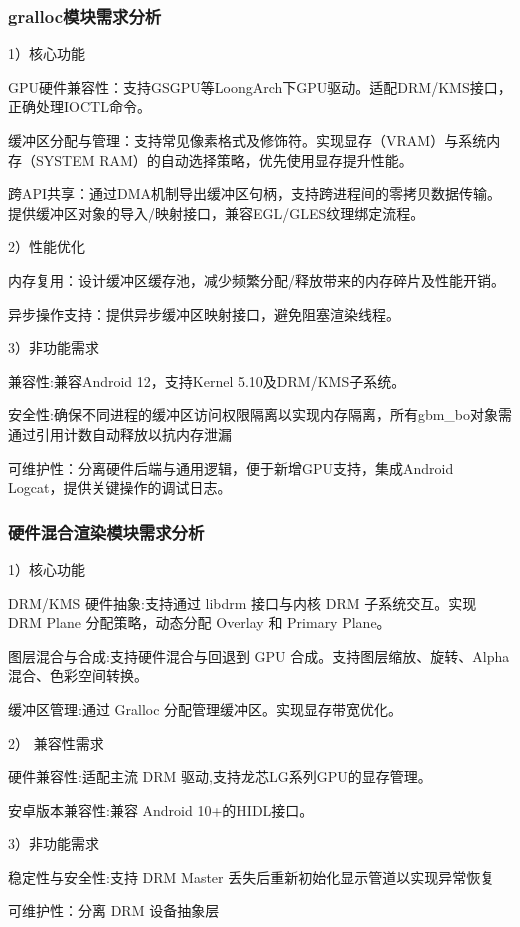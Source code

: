 \subsubsection{gralloc模块需求分析}
1）核心功能

    ​GPU硬件兼容性​：支持GSGPU等LoongArch下GPU驱动。适配DRM/KMS接口，正确处理IOCTL命令。

    ​缓冲区分配与管理​：支持常见像素格式及修饰符。实现显存（VRAM）与系统内存（SYSTEM RAM）的自动选择策略，优先使用显存提升性能。

    ​跨API共享​：通过DMA机制导出缓冲区句柄，支持跨进程间的零拷贝数据传输。提供缓冲区对象的导入/映射接口，兼容EGL/GLES纹理绑定流程。

2）性能优化

    ​内存复用​​：设计缓冲区缓存池，减少频繁分配/释放带来的内存碎片及性能开销。

    ​异步操作支持​：提供异步缓冲区映射接口，避免阻塞渲染线程。

3）非功能需求
        
    兼容性:兼容Android 12，支持Kernel 5.10及DRM/KMS子系统。
        
    安全性:​确保不同进程的缓冲区访问权限隔离以实现内存隔离，所有gbm\_bo对象需通过引用计数自动释放以抗内存泄漏
        
    可维护性：分离硬件后端与通用逻辑，便于新增GPU支持，集成Android Logcat，提供关键操作的调试日志。

\subsubsection{硬件混合渲染模块需求分析}

1）核心功能

DRM/KMS 硬件抽象​:支持通过 libdrm 接口与内核 DRM 子系统交互。实现 DRM Plane 分配策略，动态分配 Overlay 和 Primary Plane。

​图层混合与合成​:支持硬件混合与回退到 GPU 合成。支持图层缩放、旋转、Alpha 混合、色彩空间转换。

​缓冲区管理​:通过 Gralloc 分配管理缓冲区。实现显存带宽优化。

2） 兼容性需求

​硬件兼容性​:适配主流 DRM 驱动,支持龙芯LG系列GPU的显存管理。

​安卓版本兼容性​:兼容 Android 10+的HIDL接口。

3）非功能需求

稳定性与安全性:支持 DRM Master 丢失后重新初始化显示管道以实现异常恢复

可维护性：​分离 DRM 设备抽象层


